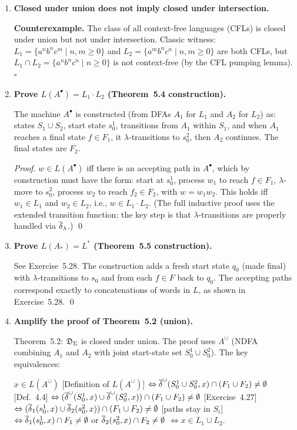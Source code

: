 \begin{enumerate}[{5.}1. ]
\item \textbf{Closed under union does not imply closed under intersection.}

\textbf{Counterexample.}  The class of all context-free languages (CFLs) is closed under union but not under intersection.  Classic witness: $L_1=\{a^nb^nc^m\mid n,m\geq 0\}$ and $L_2=\{a^mb^nc^n\mid n,m\geq 0\}$ are both CFLs, but $L_1\cap L_2=\{a^nb^nc^n\mid n\geq 0\}$ is not context-free (by the CFL pumping lemma).  $\square$

\item \textbf{Prove $L(A^\bullet)=L_1\cdot L_2$ (Theorem~5.4 construction).}

The machine $A^\bullet$ is constructed (from DFAs $A_1$ for $L_1$ and $A_2$ for $L_2$) as:
states $S_1\cup S_2$, start state $s^1_0$, transitions from $A_1$ within $S_1$, and when $A_1$ reaches a final state $f\in F_1$, it $\lambda$-transitions to $s^2_0$, then $A_2$ continues.  The final states are $F_2$.

\begin{proof}
$w\in L(A^\bullet)$ iff there is an accepting path in $A^\bullet$, which by construction must have the form: start at $s^1_0$, process $w_1$ to reach $f\in F_1$, $\lambda$-move to $s^2_0$, process $w_2$ to reach $f_2\in F_2$, with $w=w_1w_2$.  This holds iff $w_1\in L_1$ and $w_2\in L_2$, i.e., $w\in L_1\cdot L_2$.  (The full inductive proof uses the extended transition function; the key step is that $\lambda$-transitions are properly handled via $\overline{\delta}_\lambda$.) \qed
\end{proof}

\item \textbf{Prove $L(A_*)=L^*$ (Theorem~5.5 construction).}

See Exercise~5.28.  The construction adds a fresh start state $q_0$ (made final) with $\lambda$-transitions to $s_0$ and from each $f\in F$ back to $q_0$.  The accepting paths correspond exactly to concatenations of words in $L$, as shown in Exercise~5.28. \qed

\item \textbf{Amplify the proof of Theorem~5.2 (union).}

Theorem~5.2: $\mathfrak{D}_\Sigma$ is closed under union.  The proof uses $A^\cup$ (NDFA combining $A_1$ and $A_2$ with joint start-state set $S^1_0\cup S^2_0$).  The key equivalences:

$x\in L(A^\cup)$ [Definition of $L(A^\cup)$]
$\Leftrightarrow\overline{\delta}^\cup(S^1_0\cup S^2_0,x)\cap(F_1\cup F_2)\neq\emptyset$ [Def.~4.4]
$\Leftrightarrow(\overline{\delta}^\cup(S^1_0,x)\cup\overline{\delta}^\cup(S^2_0,x))\cap(F_1\cup F_2)\neq\emptyset$ [Exercise~4.27]
$\Leftrightarrow(\overline{\delta}_1(s^1_0,x)\cup\overline{\delta}_2(s^2_0,x))\cap(F_1\cup F_2)\neq\emptyset$ [paths stay in $S_i$]
$\Leftrightarrow\overline{\delta}_1(s^1_0,x)\cap F_1\neq\emptyset$ or $\overline{\delta}_2(s^2_0,x)\cap F_2\neq\emptyset$
$\Leftrightarrow x\in L_1\cup L_2$.


\end{enumerate}
